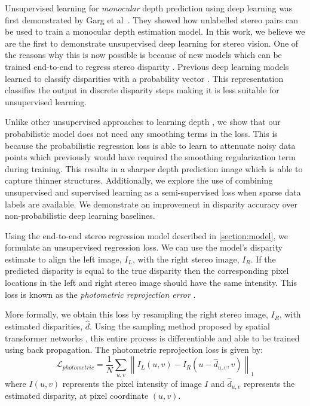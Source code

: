 Unsupervised learning for \textit{monocular} depth prediction using deep learning was first demonstrated by Garg et al~\citep{garg2016unsupervised}. They showed how unlabelled stereo pairs can be used to train a monocular depth estimation model. In this work, we believe we are the first to demonstrate unsupervised deep learning for stereo vision. One of the reasons why this is now possible is because of new models which can be trained end-to-end to regress stereo disparity \citep{kendall2017end,MIFDB16}. Previous deep learning models learned to classify disparities with a probability vector \citep{zbontar2016stereo,luo2016efficient}. This representation classifies the output in discrete disparity steps making it is less suitable for unsupervised learning.

Unlike other unsupervised approaches to learning depth \citep{garg2016unsupervised}, we show that our probabilistic model does not need any smoothing terms in the loss. This is because the probabilistic regression loss is able to learn to attenuate noisy data points which previously would have required the smoothing regularization term during training. This results in a sharper depth prediction image which is able to capture thinner structures. Additionally, we explore the use of combining unsupervised and supervised learning as a semi-supervised loss when sparse data labels are available.
We demonstrate an improvement in disparity accuracy over non-probabilistic deep learning baselines. 

Using the end-to-end stereo regression model described in \cref{section:model}, we formulate an unsupervised regression loss. We can use the model's disparity estimate to align the left image, $I_L$, with the right stereo image, $I_R$. If the predicted disparity is equal to the true disparity then the corresponding pixel locations in the left and right stereo image should have the same intensity. This loss is known as the \textit{photometric reprojection error} \citep{hartley2000}.

More formally, we obtain this loss by resampling the right stereo image, $I_R$, with estimated disparities, $\hat{d}$. Using the sampling method proposed by spatial transformer networks \citep{jaderberg2015spatial}, this entire process is differentiable and able to be trained using back propagation. The photometric reprojection loss is given by:
\begin{equation}
\mathcal{L}_{photometric} = \frac{1}{N} \sum\limits_{u,v} \left\lVert I_L(u,v) - I_R(u-\hat{d}_{u,v},v) \right\rVert_1
\label{eqn:unsupervised_loss}
\end{equation}
where $I(u,v)$ represents the pixel intensity of image $I$ and $\hat{d}_{u,v}$ represents the estimated disparity, at pixel coordinate $(u,v)$.

